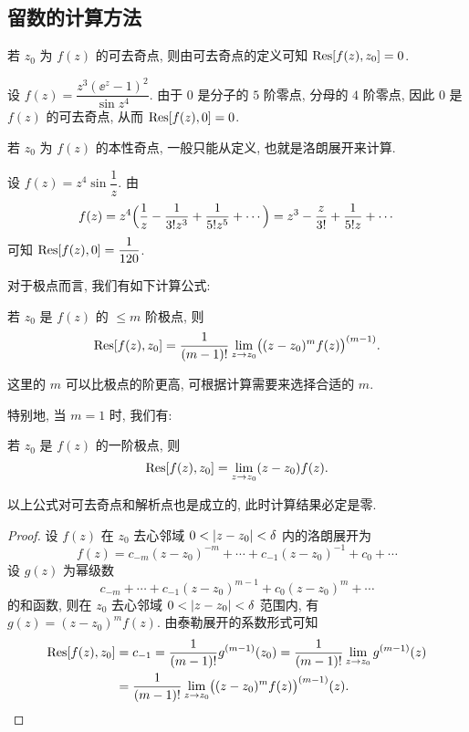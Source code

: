 \subsection{留数的计算方法}

若 $z_0$ 为 $f(z)$ 的可去奇点, 则由可去奇点的定义可知 ${\mathrm{Res}}[f(z),z_0]=0$.

\begin{example}
  设 $f(z)=\dfrac{z^3(\ee^z-1)^2}{\sin z^4}$.
  \smallskip
  由于 $0$ 是分子的 $5$ 阶零点, 分母的 $4$ 阶零点, 因此 $0$ 是 $f(z)$ 的可去奇点, 从而 ${\mathrm{Res}}[f(z),0]=0$.
\end{example}

若 $z_0$ 为 $f(z)$ 的本性奇点, 一般只能从定义, 也就是洛朗展开来计算.

\begin{example}
  设 $f(z)=z^4\sin\dfrac1z$.
  由
  \[
     f(z)
    =z^4\Bigl(\frac1z-\frac1{3!z^3}+\frac1{5!z^5}+\cdots\Bigr)
    =z^3-\frac z{3!}+\frac1{5!z}+\cdots
  \]
  可知 ${\mathrm{Res}}[f(z),0]=\dfrac1{120}$.
\end{example}

对于极点而言, 我们有如下计算公式:

\begin{theorem}[留数计算公式 I]
  \label{thm:residue-formula-for-pole}
  若 $z_0$ 是 $f(z)$ 的 $\le m$ 阶极点, 则
  \[
    {\mathrm{Res}}[f(z),z_0]=\frac1{(m-1)!}\lim_{z\rightarrow z_0}\bigl((z-z_0)^mf(z)\bigr)^{(m-1)}.
  \]
\end{theorem}

这里的 $m$ 可以比极点的阶更高, 可根据计算需要来选择合适的 $m$.

特别地, 当 $m=1$ 时, 我们有:
\begin{theorem}[留数计算公式 II]
  若 $z_0$ 是 $f(z)$ 的一阶极点, 则
  \[
    {\mathrm{Res}}[f(z),z_0]=\lim_{z\rightarrow z_0}(z-z_0)f(z).
  \]
\end{theorem}
以上公式对可去奇点和解析点也是成立的, 此时计算结果必定是零.

\begin{proof}
  设 $f(z)$ 在 $z_0$ 去心邻域 $0<\lvert z-z_0\rvert<\delta$ 内的洛朗展开为
  \[
    f(z)=c_{-m}(z-z_0)^{-m}+\cdots+c_{-1}(z-z_0)^{-1}+c_0+\cdots
  \]
  设 $g(z)$ 为幂级数
  \[
    c_{-m}+\cdots+c_{-1}(z-z_0)^{m-1}+c_0(z-z_0)^m+\cdots
  \]
  的和函数, 则在 $z_0$ 去心邻域 $0<\lvert z-z_0\rvert<\delta$ 范围内, 有 $g(z)=(z-z_0)^mf(z)$.
  由泰勒展开的系数形式可知
  \begin{align*}
     {\mathrm{Res}}[f(z),z_0]&
    =c_{-1}
    =\frac1{(m-1)!}g^{(m-1)}(z_0)
    =\frac1{(m-1)!}\lim_{z\rightarrow z_0}g^{(m-1)}(z)\\&
    =\frac1{(m-1)!}\lim_{z\rightarrow z_0}\bigl((z-z_0)^mf(z)\bigr)^{(m-1)}(z).\qedhere
  \end{align*}
\end{proof}

